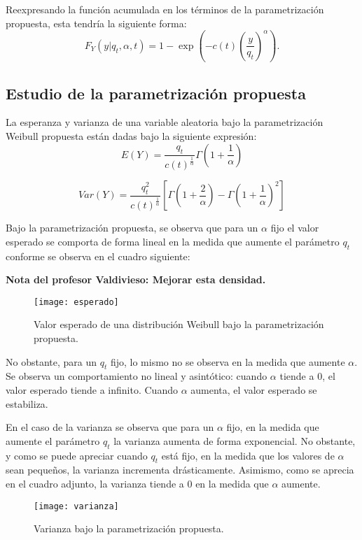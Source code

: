Reexpresando la función acumulada en los términos de la parametrización propuesta, esta tendría la siguiente forma:
\begin{equation} \label{eq:1}
F_{Y}\left(y| q_{t},\alpha,t \right)=1-\exp\left( -c(t)\left( \frac{y}{q_{t}} \right)^{\alpha} \right).
\end{equation}
\subsection{Estudio de la parametrización propuesta}

La esperanza y varianza de una variable aleatoria bajo la parametrización Weibull propuesta están dadas bajo la siguiente expresión:
\begin{equation}
E(Y)=\frac{q_{t}}{c(t)^{\frac{1}{\alpha}}}\Gamma\left( 1+\frac{1}{\alpha} \right)
\end{equation}

\begin{equation}
Var(Y)=\frac{q_{t}^{2}}{c(t)^{\frac{1}{\alpha}}}\left[ \Gamma\left( 1+\frac{2}{\alpha}\right)-\Gamma\left( 1+\frac{1}{\alpha} \right)^{2} \right]
\end{equation}

Bajo la parametrización propuesta, se observa que para un $\alpha$ fijo el valor esperado se comporta de forma lineal en la medida que aumente el parámetro $q_{t}$ conforme se observa en el cuadro siguiente:

\textbf{Nota del profesor Valdivieso: Mejorar esta densidad.}

\begin{figure}[H]
	\texttt{[image: esperado]}
	\caption{Valor esperado de una distribución Weibull bajo la parametrización propuesta.}
\end{figure}
\noindent No obstante, para un $q_{t}$ fijo, lo mismo no se observa en la medida que aumente $\alpha$. Se observa un comportamiento no lineal y asintótico: cuando $\alpha$ tiende a 0, el valor esperado tiende a infinito. Cuando $\alpha$ aumenta, el valor esperado se estabiliza.

En el caso de la varianza se observa que para un $\alpha$ fijo, en la medida que aumente el parámetro $q_{t}$ la varianza aumenta de forma exponencial. No obstante, y como se puede apreciar cuando $q_{t}$ está fijo, en la medida que los valores de $\alpha$ sean pequeños, la varianza incrementa drásticamente. Asimismo, como se aprecia en el cuadro adjunto, la varianza tiende a 0 en la medida que $\alpha$ aumente.

\begin{figure}[H]
	\texttt{[image: varianza]}
	\caption{Varianza bajo la parametrización propuesta.}
\end{figure}
